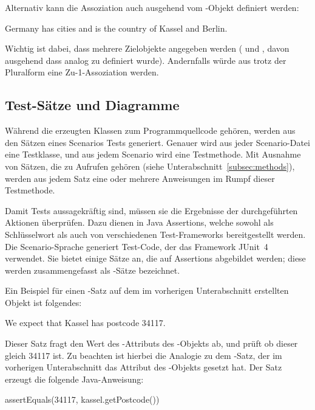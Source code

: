 Alternativ kann die Assoziation auch ausgehend vom -Objekt definiert werden:

\begin{codeblock}
    Germany has cities and is the country of Kassel and Berlin.
\end{codeblock}

Wichtig ist dabei, dass mehrere Zielobjekte angegeben werden ( und , davon ausgehend dass  analog zu  definiert wurde).
Andernfalls würde aus  trotz der Pluralform eine Zu-1-Assoziation werden.

\subsection{Test-Sätze und Diagramme}\label{subsec:test-sentences-and-diagrams}

Während die erzeugten Klassen zum Programmquellcode gehören,
werden aus den Sätzen eines Scenarios Tests generiert.
Genauer wird aus jeder Scenario-Datei eine Testklasse,
und aus jedem Scenario wird eine Testmethode.
Mit Ausnahme von Sätzen, die zu Aufrufen gehören (siehe Unterabschnitt~\ref{subsec:methods}),
werden aus jedem Satz eine oder mehrere Anweisungen im Rumpf dieser Testmethode.

Damit Tests aussagekräftig sind, müssen sie die Ergebnisse der durchgeführten Aktionen überprüfen.
Dazu dienen in Java Assertions, welche sowohl als Schlüsselwort als auch von verschiedenen Test-Frameworks bereitgestellt werden.
Die Scenario-Sprache generiert Test-Code, der das Framework JUnit~4~\cite{junit4} verwendet.
Sie bietet einige Sätze an, die auf Assertions abgebildet werden;
diese werden zusammengefasst als -Sätze bezeichnet.

Ein Beispiel für einen -Satz auf dem im vorherigen Unterabschnitt erstellten Objekt  ist folgendes:

\begin{codeblock}
    We expect that Kassel has postcode 34117.
\end{codeblock}

Dieser Satz fragt den Wert des -Attributs des -Objekts ab, und prüft ob dieser gleich 34117 ist.
Zu beachten ist hierbei die Analogie zu dem -Satz, der im vorherigen Unterabschnitt das Attribut des -Objekts gesetzt hat.
Der Satz erzeugt die folgende Java-Anweisung:

\begin{jcodeblock}
    assertEquals(34117, kassel.getPostcode())
\end{jcodeblock}

